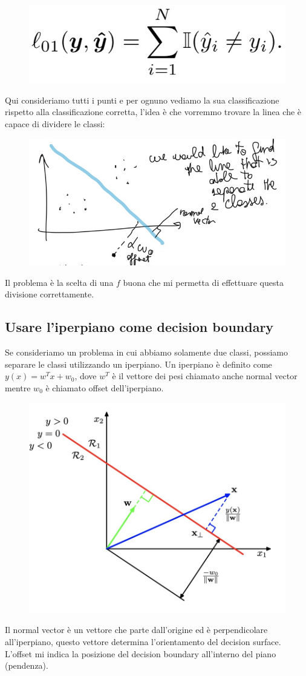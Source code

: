 \documentclass[14pt]{extreport}
\begin{document}
\begin{figure}[H]
\centering
\includegraphics[width=0.4\linewidth]{142.jpeg}
\end{figure}

Qui consideriamo tutti i punti e per ognuno vediamo la sua classificazione rispetto alla classificazione corretta, l'idea è che vorremmo trovare la
linea che è capace di dividere le classi:

\begin{figure}[H]
\centering
\includegraphics[width=0.4\linewidth]{143.jpeg}
\end{figure}

Il problema è la scelta di una $f$ buona che mi permetta di effettuare questa divisione correttamente.

\subsection{Usare l'iperpiano come decision boundary}

Se consideriamo un problema in cui abbiamo solamente due classi, possiamo separare le classi utilizzando un iperpiano. Un iperpiano è definito come
$y(x) = w^Tx + w_0$, dove $w^T$ è il vettore dei pesi chiamato anche normal vector mentre $w_0$ è chiamato offset dell'iperpiano.

\begin{figure}[H]
\centering
\includegraphics[width=0.4\linewidth]{144.jpeg}
\end{figure}

Il normal vector è un vettore che parte dall'origine ed è perpendicolare all'iperpiano, questo vettore determina l'orientamento del decision surface.
L'offset mi indica la posizione del decision boundary all'interno del piano (pendenza).
\end{document}
